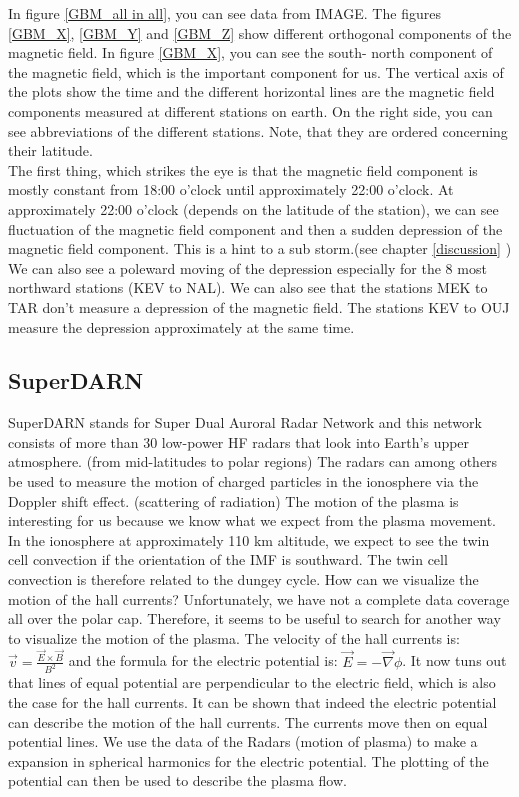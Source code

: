\documentclass[10pt,a4paper]{article}
\begin{document}
In figure \ref{GBM_all in all}, you can see data from IMAGE. The figures \ref{GBM_X}, \ref{GBM_Y} and \ref{GBM_Z} show different orthogonal components of the magnetic field. In figure \ref{GBM_X}, you can see the south- north component of the magnetic field, which is the important component for us. The vertical axis of the plots show the time and the different horizontal lines are the magnetic field components measured at different stations on earth. On the right side, you can see abbreviations of the different stations. Note, that they are ordered concerning their latitude. \\
The first thing, which strikes the eye is that the magnetic field component is mostly constant from 18:00 o'clock until approximately 22:00 o'clock. At approximately 22:00 o'clock (depends on the latitude of the station), we can see fluctuation of the magnetic field component and then a sudden depression of the magnetic field component. 
This is a hint to a sub storm.(see chapter \ref{discussion} ) We can also see a poleward moving of the depression especially for the 8 most northward stations (KEV to NAL). We can also see that the stations MEK to TAR don't measure a depression of the magnetic field. The stations KEV to OUJ measure the depression approximately at the same time. 

\clearpage

\subsection{SuperDARN \label{0_CHAPTER_SUPERDARN}}

SuperDARN stands for  Super Dual Auroral Radar Network and this network consists of more than 30 low-power HF radars that look into Earth's upper atmosphere. (from mid-latitudes to polar regions) The radars can among others be used to measure the motion of charged particles in the ionosphere via the Doppler shift effect. (scattering of radiation)
The motion of the plasma is interesting for us because we know what we expect from the plasma movement. In the ionosphere at approximately 110 km altitude, we expect to see the twin cell convection if the orientation of the IMF is southward. The twin cell convection is therefore related to the dungey cycle. 
How can we visualize the motion of the hall currents? Unfortunately, we have not a complete data coverage all over the polar cap. Therefore, it seems to be useful to search for another way to visualize the motion of the plasma. 
The velocity of the hall currents is: $\vec{v}=\frac{\vec{E}\times \vec{B}}{B^2}$ and the formula for the electric potential is: $\vec{E}=-\vec{\nabla} \phi$. It now tuns out that lines of equal potential are perpendicular to the electric field, which is also the case for the hall currents. It can be shown that indeed the electric potential can describe the motion of the hall currents. The currents move then on equal potential lines. 
We use the data of the Radars (motion of plasma) to make a expansion in spherical harmonics for the electric potential. The plotting of the potential can then be used to describe the plasma flow. 
\end{document}
